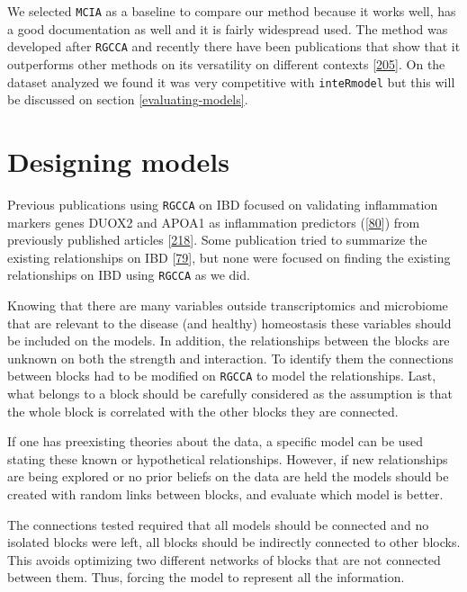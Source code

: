 \documentclass[
  a4paper,
]{book}
\begin{document}
We selected \texttt{MCIA} as a baseline to compare our method because it works well, has a good documentation as well and it is fairly widespread used.
The method was developed after \texttt{RGCCA} and recently there have been publications that show that it outperforms other methods on its versatility on different contexts {[}\protect\hyperlink{ref-cantini2021}{205}{]}.
On the dataset analyzed we found it was very competitive with \texttt{inteRmodel} but this will be discussed on section \ref{evaluating-models}.

\hypertarget{designing-models}{%
\section{Designing models}\label{designing-models}}

Previous publications using \texttt{RGCCA} on IBD focused on validating inflammation markers genes DUOX2 and APOA1 as inflammation predictors ({[}\protect\hyperlink{ref-tang2017}{80}{]}) from previously published articles {[}\protect\hyperlink{ref-haberman2014}{218}{]}.
Some publication tried to summarize the existing relationships on IBD {[}\protect\hyperlink{ref-hasler_uncoupling_2016}{79}{]}, but none were focused on finding the existing relationships on IBD using \texttt{RGCCA} as we did.

Knowing that there are many variables outside transcriptomics and microbiome that are relevant to the disease (and healthy) homeostasis these variables should be included on the models.
In addition, the relationships between the blocks are unknown on both the strength and interaction.
To identify them the connections between blocks had to be modified on \texttt{RGCCA} to model the relationships.
Last, what belongs to a block should be carefully considered as the assumption is that the whole block is correlated with the other blocks they are connected.

If one has preexisting theories about the data, a specific model can be used stating these known or hypothetical relationships.
However, if new relationships are being explored or no prior beliefs on the data are held the models should be created with random links between blocks, and evaluate which model is better.

The connections tested required that all models should be connected and no isolated blocks were left, all blocks should be indirectly connected to other blocks.
This avoids optimizing two different networks of blocks that are not connected between them.
Thus, forcing the model to represent all the information.
\end{document}
